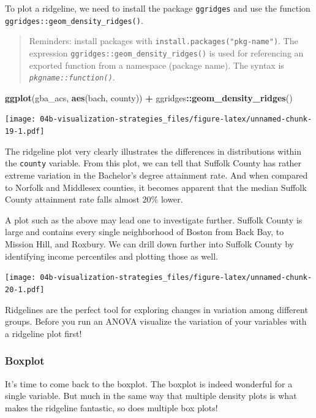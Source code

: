 \documentclass[
]{book}
\newenvironment{Shaded}{\begin{snugshade}}{\end{snugshade}}
\newcommand{\KeywordTok}[1]{\textcolor[rgb]{0.13,0.29,0.53}{\textbf{#1}}}
\newcommand{\NormalTok}[1]{#1}
\newcommand{\OperatorTok}[1]{\textcolor[rgb]{0.81,0.36,0.00}{\textbf{#1}}}
\newcommand{\StringTok}[1]{\textcolor[rgb]{0.31,0.60,0.02}{#1}}
\begin{document}
To plot a ridgeline, we need to install the package \texttt{ggridges} and use the function \texttt{ggridges::geom\_density\_ridges()}.

\begin{quote}
Reminders: install packages with \texttt{install.packages("pkg-name")}. The expression \texttt{ggridges::geom\_density\_ridges()} is used for referencing an exported function from a namespace (package name). The syntax is \emph{\texttt{pkgname::function()}}.
\end{quote}

\begin{Shaded}
\begin{Highlighting}[]
\KeywordTok{ggplot}\NormalTok{(gba\_acs, }\KeywordTok{aes}\NormalTok{(bach, county)) }\OperatorTok{+}
\StringTok{  }\NormalTok{ggridges}\OperatorTok{::}\KeywordTok{geom\_density\_ridges}\NormalTok{() }
\end{Highlighting}
\end{Shaded}

\texttt{[image: 04b-visualization-strategies\_files/figure-latex/unnamed-chunk-19-1.pdf]}

The ridgeline plot very clearly illustrates the differences in distributions within the \texttt{county} variable. From this plot, we can tell that Suffolk County has rather extreme variation in the Bachelor's degree attainment rate. And when compared to Norfolk and Middlesex counties, it becomes apparent that the median Suffolk County attainment rate falls almost 20\% lower.

A plot such as the above may lead one to investigate further. Suffolk County is large and contains every single neighborhood of Boston from Back Bay, to Mission Hill, and Roxbury. We can drill down further into Suffolk County by identifying income percentiles and plotting those as well.

\texttt{[image: 04b-visualization-strategies\_files/figure-latex/unnamed-chunk-20-1.pdf]}

Ridgelines are the perfect tool for exploring changes in variation among different groups. Before you run an ANOVA visualize the variation of your variables with a ridgeline plot first!

\hypertarget{boxplot}{%
\subsubsection{Boxplot}\label{boxplot}}

It's time to come back to the boxplot. The boxplot is indeed wonderful for a single variable. But much in the same way that multiple density plots is what makes the ridgeline fantastic, so does multiple box plots!
\end{document}
